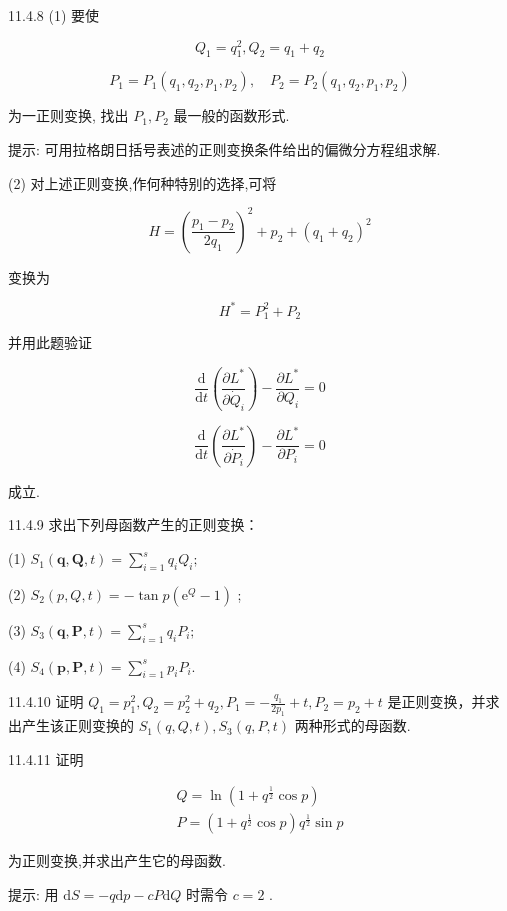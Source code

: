 \begin{problem}{11.4.8}
(1) 要使

\[
Q _ {1} = q _ {1} ^ {2}, Q _ {2} = q _ {1} + q _ {2}
\]

\[
P _ {1} = P _ {1} \left(q _ {1}, q _ {2}, p _ {1}, p _ {2}\right), \quad P _ {2} = P _ {2} \left(q _ {1}, q _ {2}, p _ {1}, p _ {2}\right)
\]

为一正则变换, 找出 $P_{1}, P_{2}$ 最一般的函数形式.

提示: 可用拉格朗日括号表述的正则变换条件给出的偏微分方程组求解.

(2) 对上述正则变换,作何种特别的选择,可将

\[
H = \left(\frac {p _ {1} - p _ {2}}{2 q _ {1}}\right) ^ {2} + p _ {2} + (q _ {1} + q _ {2}) ^ {2}
\]

变换为

\[
H ^ {*} = P _ {1} ^ {2} + P _ {2}
\]

并用此题验证

\[
\frac {\mathrm{d}}{\mathrm{d} t} \left(\frac {\partial L ^ {*}}{\partial \dot {Q} _ {i}}\right) - \frac {\partial L ^ {*}}{\partial Q _ {i}} = 0
\]

\[
\frac {\mathrm{d}}{\mathrm{d} t} \left(\frac {\partial L ^ {*}}{\partial \dot {P} _ {i}}\right) - \frac {\partial L ^ {*}}{\partial P _ {i}} = 0
\]

成立.
\end{problem}
\clearpage


\begin{problem}{11.4.9}
求出下列母函数产生的正则变换：

(1) $S_{1}(\bm {q},\bm {Q},t) = \sum_{i = 1}^{s}q_{i}Q_{i};$ 

(2) $S_{2}(p, Q, t) = -\tan p(\mathrm{e}^{Q} - 1)$ ; 

(3) $S_{3}(\bm {q},\bm {P},t) = \sum_{i = 1}^{s}q_{i}P_{i};$ 

(4) $S_{4}(\bm {p},\bm {P},t) = \sum_{i = 1}^{s}p_{i}P_{i}.$
\end{problem}
\clearpage


\begin{problem}{11.4.10}
证明 $Q_{1} = p_{1}^{2}, Q_{2} = p_{2}^{2} + q_{2}, P_{1} = -\frac{q_{1}}{2p_{1}} + t, P_{2} = p_{2} + t$ 是正则变换，并求出产生该正则变换的 $S_{1}(q, Q, t), S_{3}(q, P, t)$ 两种形式的母函数.
\end{problem}
\clearpage


\begin{problem}{11.4.11}
证明

\[
\begin{array}{c} Q = \ln \left(1 + q ^ {\frac {1}{2}} \cos p\right) \\ P = \left(1 + q ^ {\frac {1}{2}} \cos p\right) q ^ {\frac {1}{2}} \sin p \end{array}
\]

为正则变换,并求出产生它的母函数.

提示: 用 $\mathrm{d}S = -q\mathrm{d}p - cP\mathrm{d}Q$ 时需令 $c = 2$ .
\end{problem}
\clearpage


